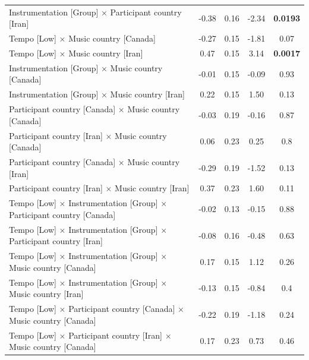 \documentclass[
  bookmarksnumbered]{article}
\begin{document}
\begin{table}[H]
{\begin{tabular}[t]{lcccc}
\hspace{1em}Instrumentation [Group] × Participant country [Iran] & -0.38 & 0.16 & -2.34 & \textbf{0.0193}\\
\hspace{1em}Tempo [Low] × Music country [Canada] & -0.27 & 0.15 & -1.81 & 0.07\\
\hspace{1em}Tempo [Low] × Music country [Iran] & 0.47 & 0.15 & 3.14 & \textbf{0.0017}\\
\hspace{1em}Instrumentation [Group] × Music country [Canada] & -0.01 & 0.15 & -0.09 & 0.93\\
\hspace{1em}Instrumentation [Group] × Music country [Iran] & 0.22 & 0.15 & 1.50 & 0.13\\
\hspace{1em}Participant country [Canada] × Music country [Canada] & -0.03 & 0.19 & -0.16 & 0.87\\
\hspace{1em}Participant country [Iran] × Music country [Canada] & 0.06 & 0.23 & 0.25 & 0.8\\
\hspace{1em}Participant country [Canada] × Music country [Iran] & -0.29 & 0.19 & -1.52 & 0.13\\
\hspace{1em}Participant country [Iran] × Music country [Iran] & 0.37 & 0.23 & 1.60 & 0.11\\
\hspace{1em}Tempo [Low] × Instrumentation [Group] × Participant country [Canada] & -0.02 & 0.13 & -0.15 & 0.88\\
\hspace{1em}Tempo [Low] × Instrumentation [Group] × Participant country [Iran] & -0.08 & 0.16 & -0.48 & 0.63\\
\hspace{1em}Tempo [Low] × Instrumentation [Group] × Music country [Canada] & 0.17 & 0.15 & 1.12 & 0.26\\
\hspace{1em}Tempo [Low] × Instrumentation [Group] × Music country [Iran] & -0.13 & 0.15 & -0.84 & 0.4\\
\hspace{1em}Tempo [Low] × Participant country [Canada] × Music country [Canada] & -0.22 & 0.19 & -1.18 & 0.24\\
\hspace{1em}Tempo [Low] × Participant country [Iran] × Music country [Canada] & 0.17 & 0.23 & 0.73 & 0.46\\

\end{tabular}}
\end{table}
\end{document}
